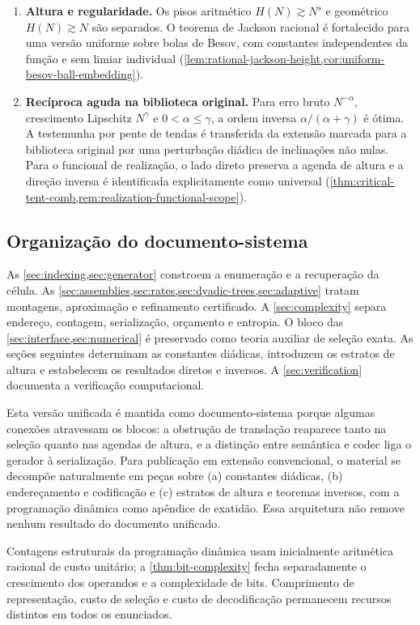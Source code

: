 \begin{enumerate}[label=(\roman*),leftmargin=*]
 \item \textbf{Altura e regularidade.} Os pisos aritmético
 $H(N)\gtrsim N^s$ e geométrico $H(N)\gtrsim N$ são separados. O teorema de
 Jackson racional é fortalecido para uma versão uniforme sobre bolas de Besov,
 com constantes independentes da função e sem limiar individual
 (\cref{lem:rational-jackson-height,cor:uniform-besov-ball-embedding}).

 \item \textbf{Recíproca aguda na biblioteca original.} Para erro bruto
 $N^{-\alpha}$, crescimento Lipschitz $N^\gamma$ e $0<\alpha\le\gamma$, a ordem inversa
 $\alpha/(\alpha+\gamma)$ é ótima. A testemunha por pente de tendas é
 transferida da extensão marcada para a biblioteca original por uma
 perturbação diádica de inclinações não nulas. Para o funcional de realização,
 o lado direto preserva a agenda de altura e a direção inversa é identificada
 explicitamente como universal
 (\cref{thm:critical-tent-comb,rem:realization-functional-scope}).
\end{enumerate}

\subsection{Organização do documento-sistema}

As \cref{sec:indexing,sec:generator} constroem a enumeração e a recuperação da
célula. As \cref{sec:assemblies,sec:rates,sec:dyadic-trees,sec:adaptive}
tratam montagens, aproximação e refinamento certificado. A
\cref{sec:complexity} separa endereço, contagem, serialização, orçamento e
entropia. O bloco das \cref{sec:interface,sec:numerical} é preservado como
teoria auxiliar de seleção exata. As seções seguintes determinam as constantes
diádicas, introduzem os estratos de altura e estabelecem os resultados diretos
e inversos. A \cref{sec:verification} documenta a verificação computacional.

Esta versão unificada é mantida como documento-sistema porque algumas conexões
atravessam os blocos: a obstrução de translação reaparece tanto na seleção
quanto nas agendas de altura, e a distinção entre semântica e codec liga o
gerador à serialização. Para publicação em extensão convencional, o material
se decompõe naturalmente em peças sobre (a) constantes diádicas, (b)
endereçamento e codificação e (c) estratos de altura e teoremas inversos, com a
programação dinâmica como apêndice de exatidão. Essa arquitetura não remove
nenhum resultado do documento unificado.

Contagens estruturais da programação dinâmica usam inicialmente aritmética
racional de custo unitário; a \cref{thm:bit-complexity} fecha separadamente o
crescimento dos operandos e a complexidade de bits. Comprimento de
representação, custo de seleção e custo de decodificação permanecem recursos
distintos em todos os enunciados.
